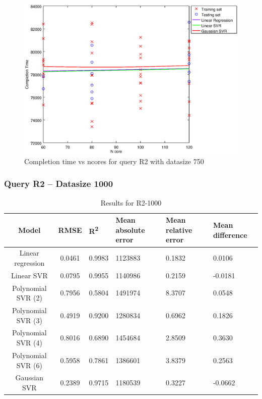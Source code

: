 \documentclass[a4paper,11pt]{article}
\begin{document}
\begin {figure}[hbtp]
\centering
\includegraphics[width=\textwidth]{output/R2_750_LINEAR_NCORE/plot_R2_750_bestmodels.eps}
\caption{Completion time vs ncores for query R2 with datasize 750}
\label{fig:all_linear_R2_750}
\end {figure}

\newpage
\subsubsection{Query R2 -- Datasize 1000}
\begin{table}[H]
	\centering
	\begin{adjustbox}{center}
		\begin{tabular}{c | c M{1.2cm} M{2.5cm} M{2.5cm} M{1.8cm}}
			Model & RMSE & R\textsuperscript{2} & Mean absolute error & Mean relative error & Mean difference \tabularnewline
			\hline
			Linear regression & 0.0461 & 0.9983 & 1123883 & 0.1832 & 0.0106 \\
			Linear SVR & 0.0795 & 0.9955 & 1140986 & 0.2159 & -0.0181 \\
			Polynomial SVR (2) & 0.7956 & 0.5804 & 1491974 & 8.3707 & 0.0548 \\
			Polynomial SVR (3) & 0.4919 & 0.9200 & 1280834 & 0.6962 & 0.1826 \\
			Polynomial SVR (4) & 0.8016 & 0.6890 & 1454684 & 2.8509 & 0.3630 \\
			Polynomial SVR (6) & 0.5958 & 0.7861 & 1386601 & 3.8379 & 0.2563 \\
			Gaussian SVR & 0.2389 & 0.9715 & 1180539 & 0.3227 & -0.0662 \\
		\end{tabular}
	\end{adjustbox}
	\\
	\caption{Results for R2-1000}
	\label{fig:all_linear_R2_1000}
\end{table}
\end{document}
